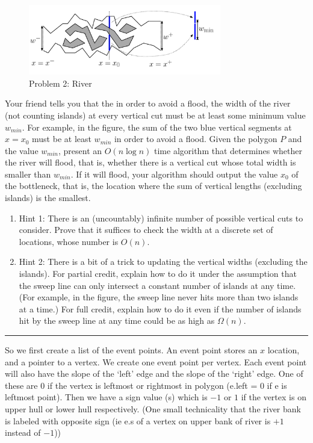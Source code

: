 \documentclass[11pt]{article}
\begin{document}
\begin{figure}[h]
    \centering
    \includegraphics[width=0.75\textwidth]{river}
    \caption{Problem 2: River}
\end{figure}

Your friend tells you that the in order to avoid a flood, the width of the river
(not counting islands) at every vertical cut must be at least some minimum value
$w_{min}$. For example, in the figure, the sum of the two blue vertical segments
at $x = x_0$ must be at least $w_{min}$ in order to avoid a flood.  Given the
polygon $P$ and the value $w_{min}$, present an $O(n \log n)$ time algorithm that
determines whether the river will flood, that is, whether there is a vertical
cut whose total width is smaller than $w_{min}$. If it will flood, your algorithm
should output the value $x_0$ of the bottleneck, that is, the location where the
sum of vertical lengths (excluding islands) is the smallest.

\begin{enumerate}

    \item Hint 1: There is an (uncountably) infinite number of possible vertical
        cuts to consider. Prove that it suffices to check the width at a
        discrete set of locations, whose number is $O(n)$.

    \item Hint 2: There is a bit of a trick to updating the vertical widths
        (excluding the islands). For partial credit, explain how to do it under
        the assumption that the sweep line can only intersect a constant number
        of islands at any time. (For example, in the figure, the sweep line
        never hits more than two islands at a time.) For full credit, explain
        how to do it even if the number of islands hit by the sweep line at any
        time could be as high as $\Omega(n)$.
\end{enumerate}
\hrule


So we first create a list of the event points. An event point stores an $x$ location,
and a pointer to a vertex. We create one event point per vertex. 
Each event point will also have the slope of the `left' edge
and the slope of the `right' edge.
One of these are 0 if the vertex is leftmost or rightmost in polygon (e.left = 0 if e is leftmost point).
Then we have a sign value (s) which is $-1$ or $1$ if the vertex is on upper hull or lower hull respectively.
(One small technicality that the river bank is labeled with opposite sign (ie e.s of a vertex on upper bank of river is $+1$ instead of $-1$))
\end{document}
